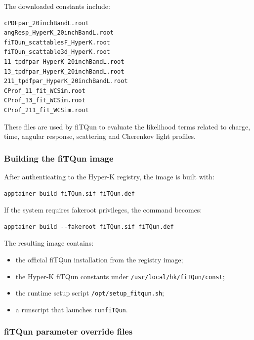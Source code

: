 \documentclass{article}
\numberwithin{table}{subsection}
\numberwithin{figure}{subsection}
\numberwithin{equation}{subsection}
\numberwithin{footnote}{subsection}
\begin{document}
The downloaded constants include:
\begin{lstlisting}[style=terminal]
cPDFpar_20inchBandL.root
angResp_HyperK_20inchBandL.root
fiTQun_scattablesF_HyperK.root
fiTQun_scattable3d_HyperK.root
11_tpdfpar_HyperK_20inchBandL.root
13_tpdfpar_HyperK_20inchBandL.root
211_tpdfpar_HyperK_20inchBandL.root
CProf_11_fit_WCSim.root
CProf_13_fit_WCSim.root
CProf_211_fit_WCSim.root
\end{lstlisting}
These files are used by fiTQun to evaluate the likelihood terms related to charge, time, angular response, scattering and Cherenkov light profiles.

\subsubsection{Building the fiTQun image}
\label{subsec:building_fitqun_image}

After authenticating to the Hyper-K registry, the image is built with:
\begin{lstlisting}[style=terminal]
apptainer build fiTQun.sif fiTQun.def
\end{lstlisting}
If the system requires fakeroot privileges, the command becomes:
\begin{lstlisting}[style=terminal]
apptainer build --fakeroot fiTQun.sif fiTQun.def
\end{lstlisting}
The resulting image contains:
\begin{itemize}
    \item the official fiTQun installation from the registry image;
    \item the Hyper-K fiTQun constants under \texttt{/usr/local/hk/fiTQun/const};
    \item the runtime setup script \texttt{/opt/setup\_fitqun.sh};
    \item a runscript that launches \texttt{runfiTQun}.
\end{itemize}

\subsubsection{fiTQun parameter override files}
\label{subsec:fitqun_override_files}
\end{document}
